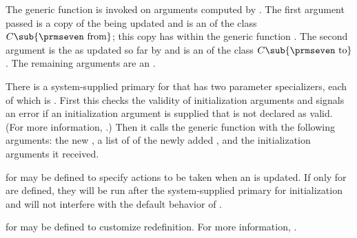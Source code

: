 The generic function  is
invoked on arguments computed by .
The first argument passed is a copy of the  being updated 
and is an  of the class $C\sub {\hbox{{\prmseven from}}}$; 
this copy has  within the generic function .  
The second argument is the  as updated so far by 
and is an  of the class $C\sub {\hbox{{\prmseven to}}}$.
The remaining arguments are an .


There is a system-supplied primary  for 
 that has two parameter
specializers, each of which is .  First
this  checks the validity of initialization arguments and
signals an error if an initialization argument is supplied that is not
declared as valid.  (For more information, \seesection\DeclaringInitargValidity.)
Then it calls the
generic function  with the following arguments:
the
new
, a list of  of the newly added 
, and the
initialization arguments it received.

\endsubsection%

             
 for  may be defined
to specify actions to be taken when an  is updated.  If only
 for  are
defined, they will be run after the system-supplied primary  for
initialization and will not interfere with the default behavior of
.

for  may be defined to customize 
redefinition.  For more information, \seesection\SharedInitialize.
  
\endsubsection%

